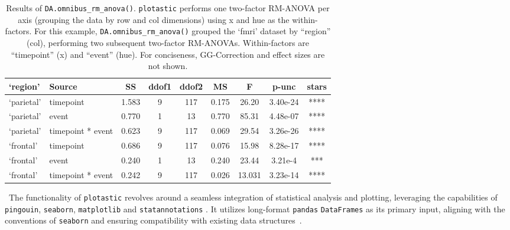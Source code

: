 \begin{table}[ht]
      \centering
      \caption{Results of \texttt{DA.omnibus\_rm\_anova()}. \texttt{plotastic}
            performs one two-factor RM-ANOVA per axis (grouping the data by row and
            col dimensions) using x and hue as the within-factors. For this example,
            \texttt{DA.omnibus\_rm\_anova()} grouped the `fmri' dataset by ``region''
            (col), performing two subsequent two-factor RM-ANOVAs. Within-factors are
            ``timepoint'' (x) and ``event'' (hue). For conciseness, GG-Correction and
            effect sizes are not shown.}
      \begin{tabular}{llccccccc}
            \hline
            `region'   & Source            & SS    & ddof1 & ddof2 & MS    & F      & p-unc    & stars \\
            \hline
            `parietal' & timepoint         & 1.583 & 9     & 117   & 0.175 & 26.20  & 3.40e-24 & ****  \\
            `parietal' & event             & 0.770 & 1     & 13    & 0.770 & 85.31  & 4.48e-07 & ****  \\
            `parietal' & timepoint * event & 0.623 & 9     & 117   & 0.069 & 29.54  & 3.26e-26 & ****  \\
            `frontal'  & timepoint         & 0.686 & 9     & 117   & 0.076 & 15.98  & 8.28e-17 & ****  \\
            `frontal'  & event             & 0.240 & 1     & 13    & 0.240 & 23.44  & 3.21e-4  & ***   \\
            `frontal'  & timepoint * event & 0.242 & 9     & 117   & 0.026 & 13.031 & 3.23e-14 & ****  \\
            \hline
      \end{tabular}
      \label{tab:RMANOVA}
      \vspace{\vfull} %
\end{table}


\
The functionality of \texttt{plotastic} revolves around a seamless integration
of statistical analysis and plotting, leveraging the capabilities of
\texttt{pingouin}, \texttt{seaborn}, \texttt{matplotlib} and
\texttt{statannotations} \cite{vallatPingouinStatisticsPython2018,
      waskomSeabornStatisticalData2021, hunterMatplotlib2DGraphics2007,
      charlierTrevismdStatannotationsV02022}. It utilizes long-format \texttt{pandas}
\texttt{DataFrames} as its primary input, aligning with the conventions of
\texttt{seaborn} and ensuring compatibility with existing data
structures~\cite{wickhamTidyData2014a, reback2020pandas,
      mckinneyDataStructuresStatistical2010}.

